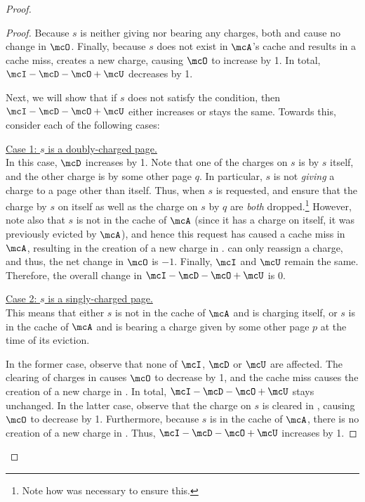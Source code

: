 \documentclass[11pt]{article}
\begin{document}
\begin{proof}
\begin{proof}
        Because $s$ is neither giving nor bearing any charges, both  and  cause no change in $\mcO$. Finally, because $s$ does not exist in $\mcA$'s cache and results in a cache miss,  creates a new charge, causing $\mcO$ to increase by 1. In total, $\mcI-\mcD-\mcO+\mcU$ decreases by 1.

        \smallskip
        Next, we will show that if $s$ does not satisfy the condition, then $\mcI-\mcD-\mcO+\mcU$ either increases or stays the same. Towards this, consider each of the following cases: 
        
        \medskip\noindent\underline{Case 1: $s$ is a doubly-charged page.} \\
        In this case, $\mcD$ increases by 1. Note that one of the charges on $s$ is by $s$ itself, and the other charge is by some other page $q$. In particular, $s$ is not \textit{giving} a charge to a page other than itself. Thus, when $s$ is requested,  and  ensure that the charge by $s$ on itself as well as the charge on $s$ by $q$ are \textit{both} dropped.\footnote{Note how  was necessary to ensure this.} However, note also that $s$ is not in the cache of $\mcA$ (since it has a charge on itself, it was previously evicted by $\mcA$), and hence this request has caused a cache miss in $\mcA$, resulting in the creation of a new charge in .  can only reassign a charge, and thus, the net change in $\mcO$ is $-1$. Finally, $\mcI$ and $\mcU$ remain the same. Therefore, the overall change in $\mcI - \mcD - \mcO + \mcU$ is 0. \medskip
        
        \noindent\underline{Case 2: $s$ is a singly-charged page.} \\
        This means that either $s$ is not in the cache of $\mcA$ and is charging itself, or $s$ is in the cache of $\mcA$ and is bearing a charge given by some other page $p$ at the time of its eviction. 
        
        In the former case, observe that none of $\mcI$, $\mcD$ or $\mcU$ are affected. The clearing of charges in  causes $\mcO$ to decrease by 1, and the cache miss causes the creation of a new charge in . In total, $\mcI-\mcD-\mcO+\mcU$ stays unchanged.
        In the latter case, observe that the charge on $s$ is cleared in , causing $\mcO$ to decrease by 1. Furthermore, because $s$ is in the cache of $\mcA$, there is no creation of a new charge in . Thus, $\mcI-\mcD-\mcO+\mcU$ increases by 1.


\end{proof}
\end{proof}
\end{document}
